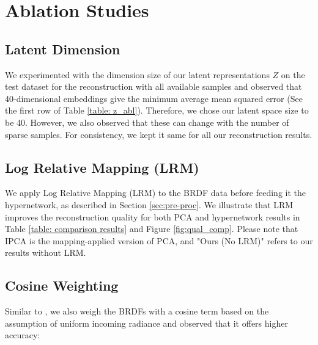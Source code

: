 \newpage
\setcounter{page}{1}

\section{Ablation Studies}\label{sec:abl}
\subsection{Latent Dimension}
We experimented with the dimension size of our latent representations $Z$ on the test dataset for the reconstruction with all available samples and observed that 40-dimensional embeddings give the minimum average mean squared error (See the first row of Table \ref{table: z_abl}). Therefore, we chose our latent space size to be 40. However, we also observed that these can change with the number of sparse samples. For consistency, we kept it same for all our reconstruction results. 

\subsection{Log Relative Mapping (LRM)}\label{sec:lrm}
We apply Log Relative Mapping (LRM) \cite{nielsen2015optimal} to the BRDF data before feeding it the hypernetwork, as described in Section \ref{sec:pre-proc}. We illustrate that LRM improves the reconstruction quality for both PCA and hypernetwork results in Table \ref{table: comparison results} and Figure \ref{fig:qual_comp}. Please note that IPCA is the mapping-applied version of PCA, and "Ours (No LRM)" refers to our results without LRM.


\subsection{Cosine Weighting}
Similar to \cite{ngan2005experimental}, we also weigh the BRDFs with a cosine term based on the assumption of uniform incoming radiance and observed that it offers higher accuracy:

